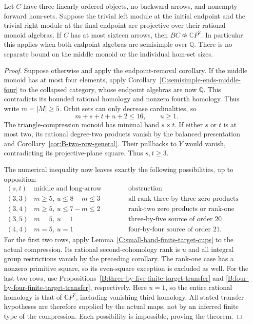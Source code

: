 \begin{theorem}
\label{C:semisimple-endpoints-sixteen}
Let $C$ have three linearly ordered objects, no backward arrows,
and nonempty forward hom-sets. Suppose the trivial left module at
the initial endpoint and the trivial right module at the final
endpoint are projective over their rational monoid algebras.
If $C$ has at most sixteen arrows, then
$BC\not\simeq\mathbb CP^2$. In particular this applies when both
endpoint algebras are semisimple over $\mathbb Q$. There is no
separate bound on the middle monoid or the individual hom-set sizes.
\end{theorem}
\begin{proof}
Suppose otherwise and apply the endpoint-removal corollary. If the
middle monoid has at most four elements, apply
Corollary~\ref{C:semisimple-ends-middle-four} to the collapsed
category, whose endpoint algebras are now $\mathbb Q$. This
contradicts its bounded rational homology and nonzero fourth
homology. Thus write $m=|M|\geq5$.
Orbit sets can only decrease cardinalities, so
\[
 m+s+t+u+2\leq16,\qquad u\geq1.
\]
The triangle-compression monoid has minimal band $s\times t$.
If either $s$ or $t$ is at most two, its rational degree-two
products vanish by the balanced presentation and
Corollary~\ref{cor:B-two-row-general}. Their pullbacks to $Y$
would vanish, contradicting its projective-plane square.
Thus $s,t\geq3$.

The numerical inequality now leaves exactly the following
possibilities, up to opposition:
\[
\begin{array}{c|c|c}
 (s,t)&\text{middle and long-arrow bounds}&\text{obstruction}\\\hline
 (3,3)&m\geq5,\ u\leq8-m\leq3&
            \text{all-rank three-by-three zero products}\\
 (3,4)&m\geq5,\ u\leq7-m\leq2&
            \text{rank-two zero products or rank-one parity}\\
 (3,5)&m=5,\ u=1&\text{three-by-five source of order }20\\
 (4,4)&m=5,\ u=1&\text{four-by-four source of order }21.
\end{array}
\]
For the first two rows, apply
Lemma~\ref{C:small-band-finite-target-cups} to the actual
compression. Its rational second-cohomology rank is $u$ and
all integral group restrictions vanish by the preceding corollary.
The rank-one case has a nonzero primitive square, so its even-square
exception is excluded as well. For the last two rows, use
Propositions~\ref{B:three-by-five-finite-target-transfer} and
\ref{B:four-by-four-finite-target-transfer}, respectively.
Here $u=1$, so the entire rational homology is that of
$\mathbb CP^2$, including vanishing third homology. All stated
transfer hypotheses are therefore supplied by the actual maps,
not by an inferred finite type of the compression.
Each possibility is impossible, proving the theorem.
\end{proof}

